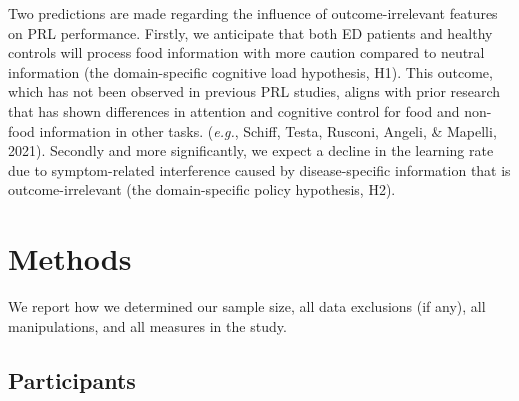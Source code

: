 \documentclass[
  man,floatsintext]{apa6}
\begin{document}
Two predictions are made regarding the influence of outcome-irrelevant features on PRL performance. Firstly, we anticipate that both ED patients and healthy controls will process food information with more caution compared to neutral information (the domain-specific cognitive load hypothesis, H1). This outcome, which has not been observed in previous PRL studies, aligns with prior research that has shown differences in attention and cognitive control for food and non-food information in other tasks. (\emph{e.g.}, Schiff, Testa, Rusconi, Angeli, \& Mapelli, 2021). Secondly and more significantly, we expect a decline in the learning rate due to symptom-related interference caused by disease-specific information that is outcome-irrelevant (the domain-specific policy hypothesis, H2).

\hypertarget{methods}{%
\section{Methods}\label{methods}}

We report how we determined our sample size, all data exclusions (if any), all manipulations, and all measures in the study.

\hypertarget{participants}{%
\subsection{Participants}\label{participants}}
\end{document}
